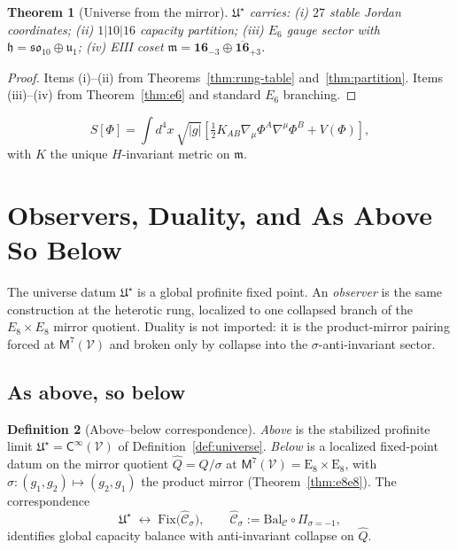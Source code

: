 \documentclass[11pt]{article}
\theoremstyle{plain}
\newtheorem{theorem}{Theorem}[section]
\theoremstyle{definition}
\newtheorem{definition}[theorem]{Definition}
\theoremstyle{remark}
\numberwithin{equation}{section}
\newcommand{\E}[1]{\mathrm{E}_{#1}}
\newcommand{\Void}{\mathcal{V}}
\newcommand{\Mirror}{\mathsf{M}}
\newcommand{\Climb}{\mathsf{C}}
\newcommand{\orderparam}{\Phi}
\begin{document}
\begin{theorem}[Universe from the mirror]\label{thm:universe}
$\mathfrak{U}^\star$ carries: (i) $27$ stable Jordan coordinates;
(ii) $1|10|16$ capacity partition; (iii) $E_6$ gauge sector with
$\mathfrak{h}=\mathfrak{so}_{10}\oplus\mathfrak{u}_1$; (iv) EIII coset
$\mathfrak{m}=\mathbf{16}_{-3}\oplus\overline{\mathbf{16}}_{+3}$.
\end{theorem}

\begin{proof}
Items (i)--(ii) from Theorems~\ref{thm:rung-table} and~\ref{thm:partition}.
Items (iii)--(iv) from Theorem~\ref{thm:e6} and standard $E_6$ branching.
\end{proof}

\begin{equation}\label{eq:action}
  S[\orderparam]=\int d^4x\,\sqrt{|g|}\left[\tfrac12 K_{AB}\nabla_\mu\orderparam^A\nabla^\mu\orderparam^B+V(\orderparam)\right],
\end{equation}
with $K$ the unique $H$-invariant metric on $\mathfrak{m}$.%
\section{Observers, Duality, and As Above So Below}
\label{sec:observer}

The universe datum $\mathfrak{U}^\star$ is a global profinite fixed point.
An \emph{observer} is the same construction at the heterotic rung, localized
to one collapsed branch of the $E_8\times E_8$ mirror quotient. Duality is not
imported: it is the product-mirror pairing forced at $\Mirror^7(\Void)$ and
broken only by collapse into the $\sigma$-anti-invariant sector.

\subsection{As above, so below}
\label{sec:observer:above-below}

\begin{definition}[Above--below correspondence]\label{def:above-below}
\emph{Above} is the stabilized profinite limit
$\mathfrak{U}^\star=\Climb^\infty(\Void)$ of Definition~\ref{def:universe}.
\emph{Below} is a localized fixed-point datum on the mirror quotient
$\hat Q=Q/\sigma$ at $\Mirror^7(\Void)=\E{8}\times\E{8}$, with
$\sigma:(g_1,g_2)\mapsto(g_2,g_1)$ the product mirror
(Theorem~\ref{thm:e8e8}). The correspondence
\begin{equation}\label{eq:above-below}
  \mathfrak{U}^\star \;\longleftrightarrow\;
  \mathrm{Fix}\!\bigl(\hat{\mathcal{C}}_\sigma\bigr),
  \qquad
  \hat{\mathcal{C}}_\sigma := \mathrm{Bal}_{\mathcal{C}}\circ \Pi_{\sigma=-1},
\end{equation}
identifies global capacity balance with anti-invariant collapse on $\hat Q$.
\end{definition}
\end{document}
